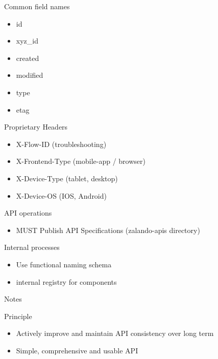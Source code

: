 \documentclass[10pt]{beamer}
\begin{document}
\begin{frame}{Common field names}
  \begin{itemize}
    \item id
    \item xyz\_id
    \item created
    \item modified
    \item type
    \item etag
  \end{itemize}

\end{frame}

\begin{frame}{Proprietary Headers}

  \begin{itemize}

    \item
          X-Flow-ID (troubleshooting)
    \item
          X-Frontend-Type (mobile-app / browser)
    \item
          X-Device-Type (tablet, desktop)
    \item
          X-Device-OS (IOS, Android)
  \end{itemize}

\end{frame}

\begin{frame}{API operations}

  \begin{itemize}

    \item
          MUST Publish API Specifications (zalando-apis directory)
  \end{itemize}

\end{frame}

\begin{frame}{Internal processes}

  \begin{itemize}

    \item
          Use functional naming schema
    \item
          internal registry for components
  \end{itemize}

\end{frame}

\begin{frame}{Notes}

  \begin{block}{Principle}

    \begin{itemize}

      \item
            Actively improve and maintain API consistency over long term
      \item
            Simple, comprehensive and usable API
    \end{itemize}

  \end{block}
\end{frame}
\end{document}
